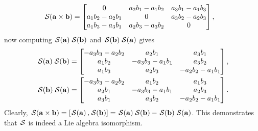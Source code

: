 \begin{example}
\begin{align*}
        \SL[\mathbf{a}\times \mathbf{b}] &= \begin{bmatrix}
            0 & a_2b_1-a_1b_2 & a_3b_1-a_1b_3\\
            a_1b_2 - a_2b_1 & 0 & a_3b_2-a_2b_3\\
            a_1b_3-a_3b_1 & a_2b_3-a_3b_2 & 0
        \end{bmatrix},
    \end{align*}
    now computing $\SL[\mathbf{a}]\SL[\mathbf{b}]$ and $\SL[\mathbf{b}]\SL[\mathbf{a}]$ gives
    \begin{align*}
        \SL[\mathbf{a}]\SL[\mathbf{b}] &=
        \begin{bmatrix}
            -a_3b_3 -a_2b_2 & a_2b_1 & a_3b_1\\
            a_1b_2 & -a_3b_3 - a_1b_1 & a_3b_2\\
            a_1b_3 & a_2b_3 & -a_2b_2 - a_1b_1
        \end{bmatrix},\\
        \SL[\mathbf{b}]\SL[\mathbf{a}] &=
        \begin{bmatrix}
            -a_3b_3 -a_2b_2 & a_1b_2 & a_1b_3\\
            a_2b_1 & -a_3b_3 - a_1b_1 & a_2b_3\\
            a_3b_1 & a_3b_2 & -a_2b_2 - a_1b_1
        \end{bmatrix}.
    \end{align*}
    Clearly, $\SL[\mathbf{a}\times \mathbf{b}] = [\SL[\mathbf{a}], \SL[\mathbf{b}]] = \SL[\mathbf{a}]\SL[\mathbf{b}] - \SL[\mathbf{b}]\SL[\mathbf{a}]$. This demonstrates that $\SL$ is indeed a Lie algebra isomorphism.
\end{example}
